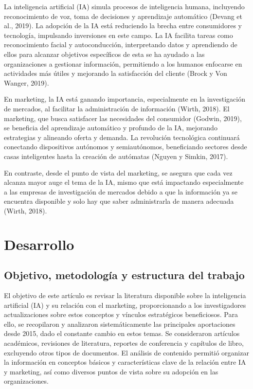 \documentclass[a4paper, 12pt, twocolumn]{article}
\begin{document}
La inteligencia artificial (IA) simula procesos de inteligencia humana, incluyendo reconocimiento de voz, toma de decisiones y aprendizaje automático (Devang et al., 2019). 
La adopción de la IA está reduciendo la brecha entre consumidores y tecnología, impulsando inversiones en este campo. La IA facilita tareas como reconocimiento facial y autoconducción, interpretando datos y aprendiendo de ellos para alcanzar objetivos específicos de esta se ha ayudado a las organizaciones a gestionar información, permitiendo a los humanos enfocarse en actividades más útiles y mejorando la satisfacción del cliente (Brock y Von Wanger, 2019). 


En marketing, la IA está ganando importancia, especialmente en la investigación de mercados, al facilitar la administración de información (Wirth, 2018). 
El marketing, que busca satisfacer las necesidades del consumidor (Godwin, 2019), se beneficia del aprendizaje automático y profundo de la IA, mejorando estrategias y alineando oferta y demanda. 
La revolución tecnológica continuará conectando dispositivos autónomos y semiautónomos, beneficiando sectores desde casas inteligentes hasta la creación de autómatas (Nguyen y Simkin, 2017).


En contraste, desde el punto de vista del marketing, se asegura que cada vez alcanza mayor auge el tema de la IA, mismo que está impactando especialmente a las empresas de investigación de mercados debido a que la información ya se encuentra disponible y solo hay que saber administrarla de manera adecuada (Wirth, 2018). 
\section{Desarrollo}
\subsection{Objetivo, metodología y estructura del trabajo}

El objetivo de este artículo es revisar la literatura disponible sobre la inteligencia artificial (IA) y su relación con el marketing, proporcionando a los investigadores actualizaciones sobre estos conceptos y vínculos estratégicos beneficiosos. Para ello, se recopilaron y analizaron sistemáticamente las principales aportaciones desde 2015, dado el constante cambio en estos temas. Se consideraron artículos académicos, revisiones de literatura, reportes de conferencia y capítulos de libro, excluyendo otros tipos de documentos. El análisis de contenido permitió organizar la información en conceptos básicos y características clave de la relación entre IA y marketing, así como diversos puntos de vista sobre su adopción en las organizaciones.
\end{document}
